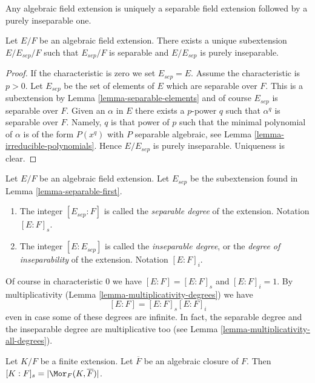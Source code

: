 \begin{lemma}
\label{lemma-separable-first}
\begin{slogan}
Any algebraic field extension is uniquely a separable field extension
followed by a purely inseparable one.
\end{slogan}
Let $E/F$ be an algebraic field extension. There exists a unique subextension
$E/E_{sep}/F$ such that $E_{sep}/F$ is separable and $E/E_{sep}$ is
purely inseparable.
\end{lemma}

\begin{proof}
If the characteristic is zero we set $E_{sep} = E$. Assume the characteristic
is $p > 0$. Let $E_{sep}$ be the set of elements of $E$ which are separable
over $F$. This is a subextension by Lemma \ref{lemma-separable-elements}
and of course $E_{sep}$ is separable over $F$. Given an $\alpha$ in $E$
there exists a $p$-power $q$ such that $\alpha^q$ is separable over $F$.
Namely, $q$ is that power of $p$ such that the minimal polynomial of
$\alpha$ is of the form $P(x^q)$ with $P$ separable algebraic, see
Lemma \ref{lemma-irreducible-polynomials}. Hence $E/E_{sep}$ is purely
inseparable. Uniqueness is clear.
\end{proof}

\begin{definition}
\label{definition-insep-degree}
Let $E/F$ be an algebraic field extension. Let $E_{sep}$ be the subextension
found in Lemma \ref{lemma-separable-first}.
\begin{enumerate}
\item The integer $[E_{sep} : F]$ is called the {\it separable
degree} of the extension. Notation $[E : F]_s$.
\item The integer $[E : E_{sep}]$ is called the {\it inseparable
degree}, or the {\it degree of inseparability} of the extension.
Notation $[E : F]_i$.
\end{enumerate}
\end{definition}

\noindent
Of course in characteristic $0$ we have $[E : F] = [E : F]_s$ and
$[E : F]_i = 1$. By multiplicativity
(Lemma \ref{lemma-multiplicativity-degrees}) we have
$$
[E : F] = [E : F]_s [E : F]_i
$$
even in case some of these degrees are infinite. In fact, the separable
degree and the inseparable degree are multiplicative too (see
Lemma \ref{lemma-multiplicativity-all-degrees}).

\begin{lemma}
\label{lemma-separable-degree}
Let $K/F$ be a finite extension. Let $\overline{F}$ be an algebraic
closure of $F$. Then $[K : F]_s = |\Mor_F(K, \overline{F})|$.
\end{lemma}

